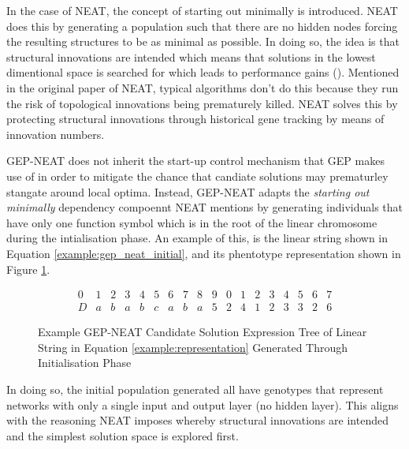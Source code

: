 \noindent In the case of NEAT, the concept of starting out minimally is introduced. NEAT does this by generating a population such that there are no hidden nodes forcing the resulting structures to be as minimal as possible. In doing so, the idea is that structural innovations are intended which means that solutions in the lowest dimentional space is searched for which leads to performance gains (\cite{stanley2002evolving}). Mentioned in the original paper of NEAT, typical algorithms don't do this because they run the risk of topological innovations being prematurely killed. NEAT solves this by protecting structural innovations through historical gene tracking by means of innovation numbers. \bigskip

\noindent GEP-NEAT does not inherit the start-up control mechanism that GEP makes use of in order to mitigate the chance that candiate solutions may prematurley stangate around local optima. Instead, GEP-NEAT adapts the \textit{starting out minimally} dependency compoennt NEAT mentions by generating individuals that have only one function symbol which is in the root of the linear chromosome during the intialisation phase. An example of this, is the linear string shown in Equation \ref{example:gep_neat_initial}, and its phentotype representation shown in Figure \ref{fig:gep_neat_initial_example}.

\begin{equation}\label{example:gep_neat_initial}
    \begin{array}{cccccccccccccccccc}
        0 & 1 & 2 & 3 & 4 & 5 & 6 & 7 & 8 & 9 & 0 & 1 & 2 & 3 & 4 & 5 & 6 & 7 \\
        D & a & b & a & b & c & a & b & a & 5 & 2 & 4 & 1 & 2 & 3 & 3 & 2 & 6
    \end{array}
\end{equation}

\begin{figure}[H] %
	\centering %
	\caption{Example GEP-NEAT Candidate Solution Expression Tree of Linear String in Equation \ref{example:representation} Generated Through Initialisation Phase}
	\label{fig:gep_neat_initial_example} %
\end{figure}

\noindent In doing so, the initial population generated all have genotypes that represent networks with only a single input and output layer (no hidden layer). This aligns with the reasoning NEAT imposes whereby structural innovations are intended and the simplest solution space is explored first.


